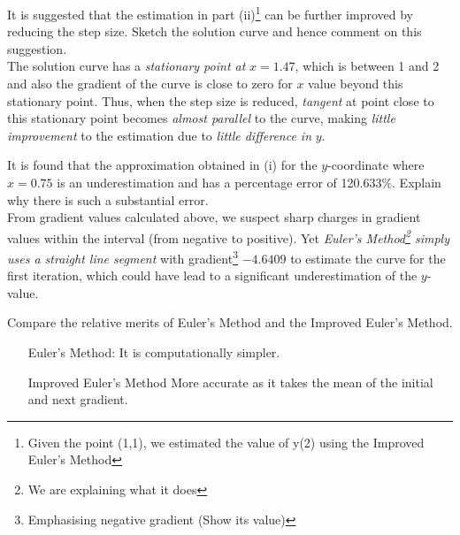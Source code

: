 \documentclass[oneside]{book}
\begin{document}
\begin{example}{}{}
  It is suggested that the estimation in part (ii)\footnote{Given the point (1,1), we estimated the value of y(2) using the Improved Euler's Method} can be further improved by reducing the step size. Sketch the solution curve and hence comment on this suggestion.\\[3mm]
  The solution curve has a \emph{stationary point at} \(x=1.47\), which is between 1 and 2 and also the gradient of the curve is close to zero for \(x\) value beyond this stationary point. Thus, when the step size is reduced, \emph{tangent} at point close to this stationary point becomes \emph{almost parallel} to the curve, making \emph{little improvement} to the estimation due to \emph{little difference in} \(y\). 
\end{example}
\begin{example}{}{}
  It is found that the approximation obtained in (i) for the \(y\)-coordinate where \(x=0.75\) is an underestimation and has a percentage error of 120.633\%. Explain why there is such a substantial error.\\[3mm]
  From gradient values calculated above, we suspect sharp charges in gradient values within the interval (from negative to positive). Yet \emph{Euler's Method\footnote{We are explaining what it does} simply uses a straight line segment} with gradient\footnote{Emphasising negative gradient (Show its value)} \(-4.6409\) to estimate the curve for the first iteration, which could have lead to a significant underestimation of the \(y\)-value.
\end{example}
\begin{example}{}{}
  Compare the relative merits of Euler's Method and the Improved Euler's Method.
  \begin{enumerate}[wide=0pt, leftmargin=*]
    \item[Euler's Method:] It is computationally simpler.
    \item[Improved Euler's Method] More accurate as it takes the mean of the initial and next gradient. 
  \end{enumerate}
\end{example}
\end{document}
